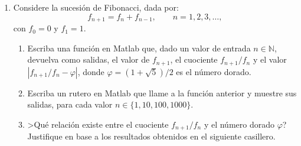 \documentclass[letter,11pt]{article}
\newcommand{\matlab}{{\sc Matlab} }
\begin{document}
\begin{enumerate}
Escriba un rutero \matlab que realice el ajuste y grafique conjuntamente la curva ajustada en el intervalo $\theta \in [0,\pi]$ y los ocho pares ordenados de la tabla (recuerde que en \matlab la funci\'on seno se llama \texttt{sin}).

Complete la siguiente tabla:


\medskip
\noindent ?`C\'omo nombr\'o a su rutero?\newline
{}

\textbf{Desarrollo:} Un rutero que realiza las tareas solicitadas es:
\begin{lstlisting}
t = [0.36 1.46 1.53 1.81 2.24 2.46 2.72 2.84]';
f = [0.48 0.21 0.08 -0.44 -0.97 -0.97 -0.63 -0.31]';
A = [ones(size(t)) sin(2*t)./sin(t) sin(3*t)./sin(t) sin(4*t)./sin(t)];
c = A\f
tt = linspace(0,pi,512);
ff = c(1) + c(2)*sin(2*tt)./sin(tt) + c(3)*sin(3*tt)./sin(tt) + c(4)*sin(4*tt)./sin(tt);
plot(tt, ff, '-', t, f, 'o')
\end{lstlisting}

En \textsc{Octave} obtuve \texttt{c = [-0.0045619; 0.6630383; -0.0011977; -0.2696056]}.

A alguien podría ocurr\'irsele multiplicar el modelo por $\sen(\theta)$ y aplicar m\'inimos cuadrados a ese modelo modificado.
Eso tambi\'en es admisible.
En ese caso los par\'ametros ajustados son parecidos pero distintos: \texttt{c = [-0.021768; 0.628855; -0.019332; -0.229573]}.


\item Considere la sucesi\'on de Fibonacci, dada por:
$$
f_{n+1}=f_n+f_{n-1}, \qquad n=1,2,3,\ldots,
$$
con $f_0=0$ y $f_1=1$. 
\begin{enumerate}
\item Escriba una funci\'on en \matlab que, dado un valor de entrada $n\in \mathbb{N}$, devuelva como salidas, el valor de $f_{n+1}$, el cuociente $f_{n+1}/f_n$ y el valor $|f_{n+1}/f_n-\varphi|$, donde $\varphi=(1+\sqrt{5})/2$ es el n\'umero dorado.
\item Escriba un rutero en \matlab que llame a la funci\'on anterior y muestre sus salidas, para cada valor $n\in \{1, 10, 100, 1000\}$.
\item >Qu\'e relaci\'on existe entre el cuociente $f_{n+1}/f_n$ y el n\'umero dorado $\varphi$? Justifique en base a los resultados obtenidos en el siguiente casillero.\bigskip


\end{enumerate}
\end{enumerate}
\end{document}
